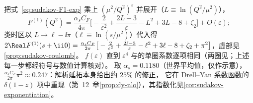 把式~\eqref{eq:sudakov-F1-exp} 乘上 $(\mu^2/Q^2)^\varepsilon$ 并展开（$L\equiv\ln(Q^2/\mu^2)$），
\begin{equation}\label{eq:sudakov-F1-L}
F^{(1)}(Q^2)=\frac{\alpha_sC_F}{4\pi}\Big[-\frac2{\varepsilon^2}+\frac{2L-3}{\varepsilon}-L^2+3L-8+\zeta_2\Big]+O(\varepsilon);
\end{equation}
类时区以 $L\to\ell-\ii\pi$（$\ell\equiv\ln(s/\mu^2)$）代入得 $2\Real F^{(1)}(s+\ii0)=\frac{\alpha_sC_F}{2\pi}\big[-\frac2{\varepsilon^2}+\frac{2\ell-3}{\varepsilon}-\ell^2+3\ell-8+\zeta_2+\pi^2\big]$，虚部见\cref{prop:sudakov-coulomb}。
$f(\varepsilon)$ 直到 $\varepsilon^4$ 与\cite[式~(3.5)]{MochVermaserenVogt2005}的单圈系数逐项相同（两圈见\cite{Gonsalves1983}；上述每一步都经符号与数值计算核对）。%
取 $\alpha_s=0.1180$（世界平均值\cite{ParticleDataGroup:2024cfk}，仅作示意），$\frac{\alpha_sC_F}{2\pi}\pi^2\approx0.247$：解析延拓本身给出约 $25\%$ 的修正，
它在 Drell--Yan 系数函数的 $\delta(1-z)$ 项中重现（第~12~章\cref{prop:dy-nlo}），其指数化见\cref{cor:sudakov-exponentiation}。
